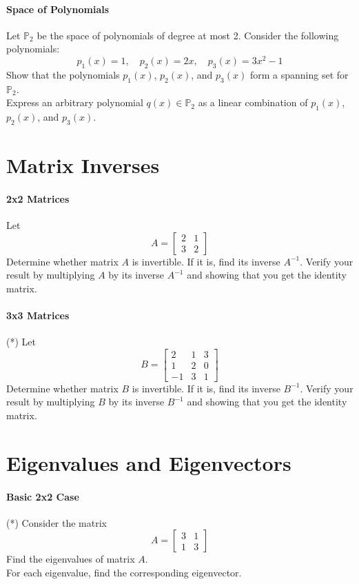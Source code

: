 \documentclass[]{article}
\begin{document}
	\paragraph{Space of Polynomials}
	Let $\mathbb{P}_2$ be the space of polynomials of degree at most 2.
	Consider the following polynomials:
	$$p_1(x) = 1, \quad p_2(x) = 2x, \quad p_3(x) = 3x^2 - 1$$
	Show that the polynomials $p_1(x)$, $p_2(x)$, and $p_3(x)$ form a spanning set for $\mathbb{P}_2$.\\
	Express an arbitrary polynomial $q(x) \in \mathbb{P}_2$ as a linear combination of $p_1(x)$, $p_2(x)$, and $p_3(x)$.
	
	
	\section{Matrix Inverses}
	\paragraph{2x2 Matrices}
	Let
	$$A = \begin{bmatrix}
		2 & 1 \\
		3 & 2
	\end{bmatrix}$$
	Determine whether matrix $A$ is invertible.
	If it is, find its inverse $A^{-1}$.
	Verify your result by multiplying $A$ by its inverse $A^{-1}$ and showing that you get the identity matrix.
	
	\paragraph{3x3 Matrices}
	(*) Let
	$$B = \begin{bmatrix}
		2 & 1 & 3 \\
		1 & 2 & 0 \\
		-1 & 3 & 1
	\end{bmatrix}$$
	Determine whether matrix $B$ is invertible. If it is, find its inverse $B^{-1}$.
	Verify your result by multiplying $B$ by its inverse $B^{-1}$ and showing that you get the identity matrix.
	
	
	\section{Eigenvalues and Eigenvectors}
	\paragraph{Basic 2x2 Case}
	(*) Consider the matrix
	$$A = \begin{bmatrix}
		3 & 1 \\
		1 & 3
	\end{bmatrix}$$
	Find the eigenvalues of matrix $A$.\\
	For each eigenvalue, find the corresponding eigenvector.
	
\end{document}
